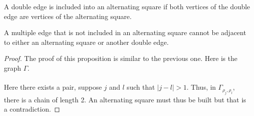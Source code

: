 \begin{definition}
  A double edge is included into an alternating square if both vertices of the double edge are vertices of the alternating square.
\end{definition}

\begin{proposition}
  A multiple edge that is not included in an alternating square cannot be adjacent to either an alternating square or another double edge.
\end{proposition}

\begin{proof}
  The proof of this proposition is similar to the previous one. Here is the graph $\Gamma$.

  \begin{figure}[H]
    \begin{center}
      \caption{}
    \end{center}
  \end{figure}

  \paragraph{}
  Here there exists a pair, suppose $j$ and $l$ such that $|j-l| > 1$. Thus, in $\Gamma_{\rho_j, \rho_l}$, there is a chain of length 2. An alternating square must thus be built but that is a contradiction.

\end{proof}

